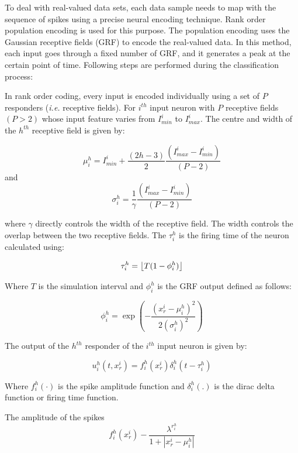 To deal with real-valued data sets, each data sample needs to map with the sequence of spikes using a precise neural encoding technique. Rank order population encoding is used for this purpose. The population encoding uses the Gaussian receptive fields (GRF) to encode the real-valued data. In this method, each input goes through a fixed number of GRF, and it generates a peak at the certain point of time. Following steps are performed during the classification process:

In rank order coding, every input is encoded individually using a set of $P$ responders (\emph{i.e.} receptive fields). For $i^{th}$ input neuron with $P$ receptive fields $(P>2)$ whose input feature varies from $I^i_{min}$ to $I^i_{max}$. The centre and width of the $h^{th}$ receptive field is given by:

\begin{equation}
	\mu_i^h=I_{min}^i+\frac{(2h-3)}{2}\frac{(I_{max}^i-I_{min}^i)}{(P-2)}
\end{equation}
and
\begin{equation}
	\sigma_i^h=\frac{1}{\gamma}\frac{(I_{max}^i-I_{min}^i)}{(P-2)}
\end{equation} 

where $\gamma$ directly controls the width of the receptive field. The width controls the overlap between the two receptive fields. The $\tau_i^h$ is the firing time of the neuron calculated using:

\begin{equation}
	\tau_i^h=\floor*{T(1-\phi^h_i)}
\end{equation}

Where $T$ is the simulation interval and $\phi^h_i$ is the GRF output defined as follows:

\begin{equation}
	\phi_i^h=\exp(-\frac{(x_r^i-\mu_i^h)^2}{2(\sigma_i^h)^2})
\end{equation}

The output of the $h^{th}$ responder of the $i^{th}$ input neuron is given by:

\begin{equation}
	u_i^h(t, x_r^i)=f_i^h(x_r^i)\delta_i^h(t-\tau_i^h)
\end{equation}

Where $f_i^h(\cdot)$ is the spike amplitude function and $\delta_i^h(.)$ is the dirac delta function or firing time function.

The amplitude of the spikes 
\begin{equation}
	f_i^h(x_r^i)-\frac{\lambda^{r_i^h}}{1+|x_r^i-\mu_i^h|} 
\end{equation}

